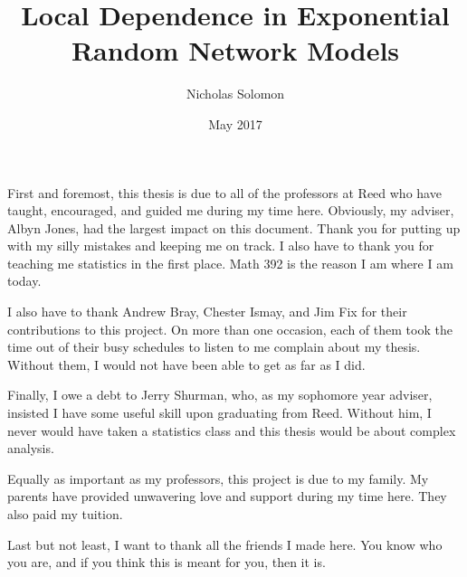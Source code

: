 \documentclass[12pt,twoside]{reedthesis}
\title{Local Dependence in Exponential Random Network Models}
\author{Nicholas Solomon}
\date{May 2017}
\theoremstyle{definition}
\theoremstyle{definition}
\theoremstyle{remark}
\begin{document}
  \maketitle

\frontmatter %
\pagestyle{empty} %
  \begin{acknowledgements}
    First and foremost, this thesis is due to all of the professors at Reed
    who have taught, encouraged, and guided me during my time here.
    Obviously, my adviser, Albyn Jones, had the largest impact on this
    document. Thank you for putting up with my silly mistakes and keeping me
    on track. I also have to thank you for teaching me statistics in the
    first place. Math 392 is the reason I am where I am today.
    
    I also have to thank Andrew Bray, Chester Ismay, and Jim Fix for their
    contributions to this project. On more than one occasion, each of them
    took the time out of their busy schedules to listen to me complain about
    my thesis. Without them, I would not have been able to get as far as I
    did.
    
    Finally, I owe a debt to Jerry Shurman, who, as my sophomore year
    adviser, insisted I have some useful skill upon graduating from Reed.
    Without him, I never would have taken a statistics class and this thesis
    would be about complex analysis.
    
    Equally as important as my professors, this project is due to my family.
    My parents have provided unwavering love and support during my time
    here. They also paid my tuition.
    
    Last but not least, I want to thank all the friends I made here. You
    know who you are, and if you think this is meant for you, then it is.
  \end{acknowledgements}

  \hypersetup{linkcolor=black}
  \setcounter{tocdepth}{1}
  \tableofcontents

  \listoftables
\end{document}
